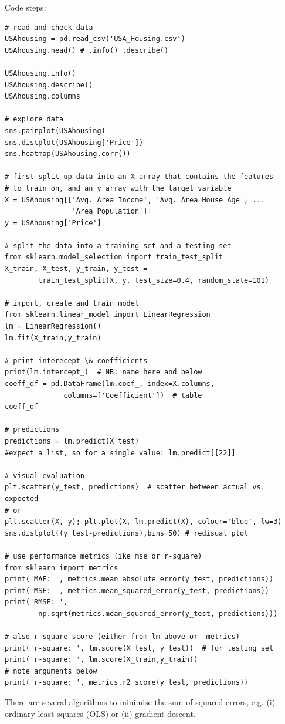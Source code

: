\documentclass[11pt]{article}
\begin{document}
Code steps:
\begin{lstlisting}
# read and check data
USAhousing = pd.read_csv('USA_Housing.csv')
USAhousing.head() # .info() .describe()

USAhousing.info()
USAhousing.describe()
USAhousing.columns

# explore data
sns.pairplot(USAhousing)
sns.distplot(USAhousing['Price'])
sns.heatmap(USAhousing.corr())

# first split up data into an X array that contains the features 
# to train on, and an y array with the target variable
X = USAhousing[['Avg. Area Income', 'Avg. Area House Age', ... 
				'Area Population']]
y = USAhousing['Price']

# split the data into a training set and a testing set
from sklearn.model_selection import train_test_split
X_train, X_test, y_train, y_test = 
		train_test_split(X, y, test_size=0.4, random_state=101)

# import, create and train model
from sklearn.linear_model import LinearRegression
lm = LinearRegression()
lm.fit(X_train,y_train)

# print interecept \& coefficients
print(lm.intercept_)  # NB: name here and below
coeff_df = pd.DataFrame(lm.coef_, index=X.columns, 
              columns=['Coefficient'])  # table
coeff_df

# predictions
predictions = lm.predict(X_test)
#expect a list, so for a single value: lm.predict[[22]]

# visual evaluation
plt.scatter(y_test, predictions)  # scatter between actual vs. expected
# or
plt.scatter(X, y); plt.plot(X, lm.predict(X), colour='blue', lw=3)
sns.distplot((y_test-predictions),bins=50) # redisual plot

# use performance metrics (ike mse or r-square)
from sklearn import metrics
print('MAE: ', metrics.mean_absolute_error(y_test, predictions))
print('MSE: ', metrics.mean_squared_error(y_test, predictions))
print('RMSE: ', 
		np.sqrt(metrics.mean_squared_error(y_test, predictions)))

# also r-square score (either from lm above or  metrics)
print('r-square: ', lm.score(X_test, y_test))  # for testing set
print('r-square: ', lm.score(X_train,y_train))
# note arguments below
print('r-square: ', metrics.r2_score(y_test, predictions))
\end{lstlisting}

There are several algorithms to minimise the sum of squared errors, e.g. (i)  ordinary least squares (OLS) or (ii) gradient descent. 
\end{document}
